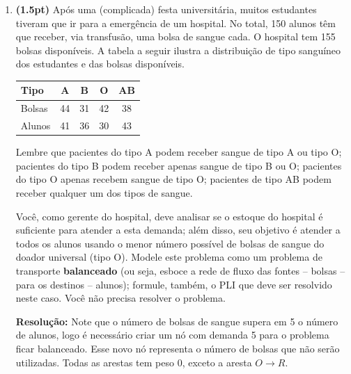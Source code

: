 \documentclass{article}
\begin{document}
\pagebreak

\begin{enumerate}[resume*=exerc]
\item {\bf (1.5pt)} Após uma (complicada) festa universitária, muitos estudantes tiveram que ir para a emergência de um hospital. No total, 150 alunos têm que receber, via transfusão, uma bolsa de sangue cada. O hospital tem 155 bolsas disponíveis. A tabela a seguir ilustra a distribuição de tipo sanguíneo dos estudantes e das bolsas disponíveis.

    \begin{center}
      \begin{tabular}{|l||c|c|c|c|}
        \hline
        Tipo & A & B & O & AB \\
        \hline\hline
        Bolsas & 44 & 31 & 42 & 38 \\
        \hline
        Alunos & 41 & 36 & 30 & 43 \\
        \hline
      \end{tabular}
    \end{center}

    Lembre que pacientes do tipo A podem receber sangue de tipo A ou tipo O; pacientes do tipo B podem receber apenas sangue de tipo B ou O; pacientes do tipo O apenas recebem sangue de tipo O; pacientes de tipo AB podem receber qualquer um dos tipos de sangue.

    Você, como gerente do hospital, deve analisar se o estoque do hospital é suficiente para atender a esta demanda; além disso, seu objetivo é atender a todos os alunos usando o menor número possível de bolsas de sangue do doador universal (tipo O). Modele este problema como um problema de transporte {\bf balanceado} (ou seja, esboce a rede de fluxo das fontes -- bolsas -- para os destinos -- alunos); formule, também, o PLI que deve ser resolvido neste caso. Você não precisa resolver o problema.
\begin{framed}
{\bf Resolução:}
Note que o número de bolsas de sangue supera em 5 o número de alunos, logo é necessário criar um nó com demanda 5 para o problema ficar balanceado. Esse novo nó representa o número de bolsas que não serão utilizadas. Todas as arestas tem peso 0, exceto a aresta $O\rightarrow R$.


\end{framed}
\end{enumerate}
\end{document}

